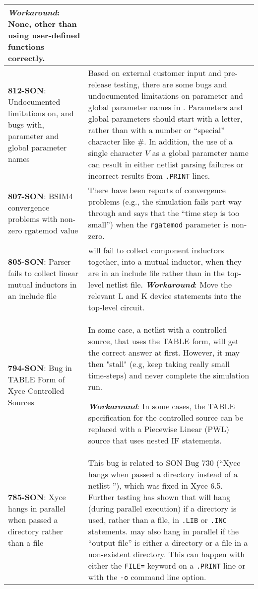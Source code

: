 {\begin{longtable}[h] {>{\raggedright\small}m{2in}|>{\raggedright\let\\\tabularnewline\small}m{3.5in}}
\textbf{\textit{Workaround}}: None, other than using \Xyce{}
user-defined functions correctly. \\ \hline  

\textbf{812-SON}: Undocumented limitations on, and bugs with, parameter and global 
parameter names & Based on external customer input and pre-release testing, there are
some bugs and undocumented limitations on parameter and global parameter names in 
\Xyce{}. Parameters and global parameters should start with a letter, rather than with a
number or ``special'' character like \#.  In addition, the use of a single 
character $V$ as a global parameter name can result in either netlist parsing failures
or incorrect results from \texttt{.PRINT} lines.  \\ \hline

\textbf{807-SON}: BSIM4 convergence problems with non-zero rgatemod value &
There have been reports of convergence problems (e.g., the \Xyce{} simulation
fails part way through and says that the ``time step is too small'')  when the 
\texttt{rgatemod} parameter is non-zero. \\ \hline

\textbf{805-SON}: Parser fails to collect linear mutual inductors in an include file & 
\Xyce{} will fail to collect component inductors together, into a mutual inductor, when
they are in an include file rather than in the top-level netlist file.  
\textbf{\textit{Workaround}}: Move the relevant L and K device statements into 
the top-level circuit. \\ \hline

\textbf{794-SON}: Bug in TABLE Form of Xyce Controlled Sources & In some case, a \Xyce{}
netlist with a controlled source, that uses the TABLE form, will get the correct answer 
at first.  However, it may then "stall" (e.g, keep taking really small time-steps)
and never complete the simulation run.  

\textbf{\textit{Workaround}}: In some cases, the TABLE specification for the controlled
source can be replaced with a Piecewise Linear (PWL) source that uses nested IF 
statements. \\ \hline

\textbf{785-SON}: Xyce hangs in parallel when passed a directory rather than a file &
This bug is related to SON Bug 730 (``Xyce hangs when passed a directory instead of a 
netlist ''), which was fixed in Xyce 6.5.  Further testing has shown that \Xyce{}
will hang (during parallel execution) if a directory is used, rather than a file, in
\texttt{.LIB} or \texttt{.INC} statements.  \Xyce{} may also hang in parallel if
the ``output file'' is either a directory or a file in a non-existent directory.
This can happen with either the \texttt{FILE=} keyword on a \texttt{.PRINT} line or
with the \texttt{-o} command line option. \\ \hline


\end{longtable}}

